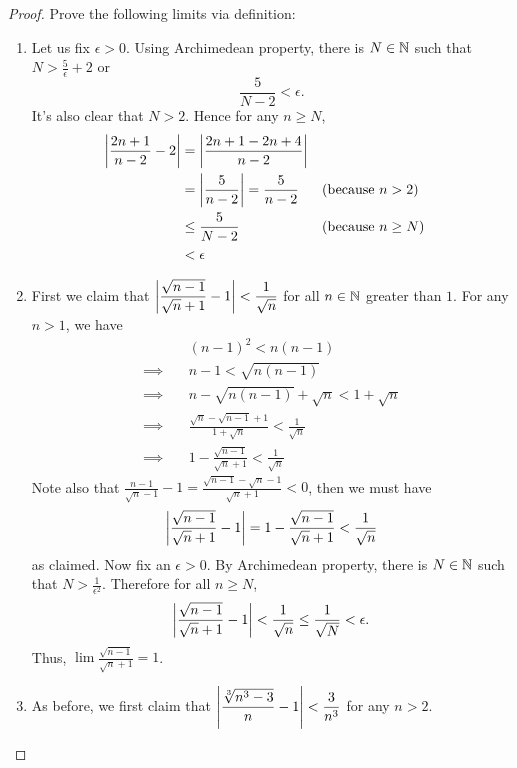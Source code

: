 \begin{proof}
  Prove the following limits via definition:
  \begin{enumerate}
    \item Let us fix $\epsilon>0$. Using Archimedean property, 
      there is $N\in\N$ such that $N>\frac{5}{\epsilon}+2$ or
      \[\frac{5}{N-2}<\epsilon.\]
      It's also clear that $N>2$. Hence for any $n\geq N$,
      \begin{align*}
        \abs*{\frac{2n+1}{n-2}-2}
        &=\abs*{\frac{2n+1-2n+4}{n-2}}\\
        &=\abs*{\frac{5}{n-2}} =\frac{5}{n-2}  
        && \text{(because $n>2$)}\\
        &\leq \frac{5}{N-2}
        && \text{(because $n\geq N$)}\\
        &<\epsilon
      \end{align*}

    \item First we claim that 
      $\displaystyle
      \abs*{\frac{\sqrt{n-1}}{\sqrt{n}+1}-1}<\frac{1}{\sqrt{n}}$
      for all $n\in\N$ greater than $1$.
      For any $n>1$, we have
      \begin{align*}
        &(n-1)^2<n(n-1)\\\implies\quad
        &n-1<\sqrt{n(n-1)}\\\implies\quad
        &n-\sqrt{n(n-1)}+\sqrt{n}<1+\sqrt{n}\\\implies\quad
        &\frac{\sqrt{n}-\sqrt{n-1}+1}{1+\sqrt{n}}<\frac{1}{\sqrt{n}}\\\implies\quad
        &1-\frac{\sqrt{n-1}}{\sqrt{n}+1}<\frac{1}{\sqrt{n}}
      \end{align*}
      Note also that 
      $\displaystyle\frac{n-1}{\sqrt n-1}-1
      =\frac{\sqrt{n-1}-\sqrt{n}-1}{\sqrt{n}+1}<0$, then we must have
      \[
        \abs*{\frac{\sqrt{n-1}}{\sqrt{n}+1}-1}=
        1-\frac{\sqrt{n-1}}{\sqrt{n}+1}<\frac{1}{\sqrt{n}}
      \]
      as claimed. Now fix an $\epsilon>0$. By Archimedean property,
      there is $N\in\N$ such that 
      $N>\frac{1}{\epsilon^2}$. Therefore for all $n\geq N$,
      \[
        \abs*{\frac{\sqrt{n-1}}{\sqrt{n}+1}-1}<\frac{1}{\sqrt n}
        \leq\frac{1}{\sqrt N}<\epsilon.
      \]
      Thus, $\boxed{\displaystyle\lim\frac{\sqrt{n-1}}{\sqrt n+1}=1}$.

    \item As before, we first claim that
      $\displaystyle\abs*{\frac{\sqrt[3]{n^3-3}}{n}-1}<\frac{3}{n^3}$
      for any $n>2$.


\end{enumerate}
\end{proof}
